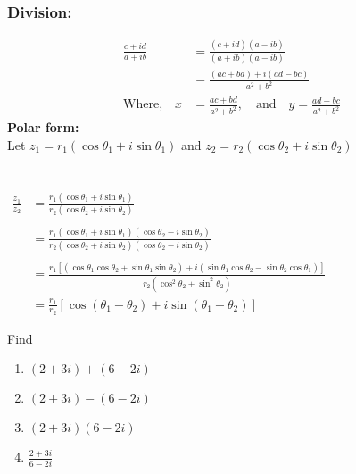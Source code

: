  \subsubsection{Division:}\begin{align*}
 \frac{c+i d}{a+i b}&=\frac{(c+i d)(a-i b)}{(a+i b)(a-i b)}\\&=\frac{(a c+b d)+i(a d-b c)}{a^{2}+b^{2}}\\
 \text{Where,}\quad x&=\frac{a c+b d}{a^{2}+b^{2}},\quad \text{and} \quad y=\frac{a d-b c}{a^{2}+b^{2}}
 \end{align*}
 \textbf{Polar form:}\\ Let $z_{1}=r_{1}\left(\cos \theta_{1}+i \sin \theta_{1}\right)$ and $z_{2}=r_{2}\left(\cos \theta_{2}+i \sin \theta_{2}\right)$\\\\\\
 $\begin{aligned} \frac{z_{1}}{z_{2}} &=\frac{r_{1}\left(\cos \theta_{1}+i \sin \theta_{1}\right)}{r_{2}\left(\cos \theta_{2}+i \sin \theta_{2}\right)}\\\\&=\frac{r_{1}\left(\cos \theta_{1}+i \sin \theta_{1}\right)\left(\cos \theta_{2}-i \sin \theta_{2}\right)}{r_{2}\left(\cos \theta_{2}+i \sin \theta_{2}\right)\left(\cos \theta_{2}-i \sin \theta_{2}\right)} \\\\ &=\frac{r_{1}\left[\left(\cos \theta_{1} \cos \theta_{2}+\sin \theta_{1} \sin \theta_{2}\right)+i\left(\sin \theta_{1} \cos \theta_{2}-\sin \theta_{2} \cos \theta_{1}\right)\right]}{r_{2}\left(\cos ^{2} \theta_{2}+\sin ^{2} \theta_{2}\right)} \\ &=\frac{r_{1}}{r_{2}}\left[\cos \left(\theta_{1}-\theta_{2}\right)+i \sin \left(\theta_{1}-\theta_{2}\right)\right] \end{aligned}$
\begin{exercise}
	Find
	\begin{enumerate}
		\item $(2+3 i)+(6-2 i)$
		\item $(2+3 i)-(6-2 i) $
		\item $(2+3 i)(6-2 i)$
		\item $\frac{2+3 i}{6-2 i}$
	\end{enumerate}
\end{exercise}
